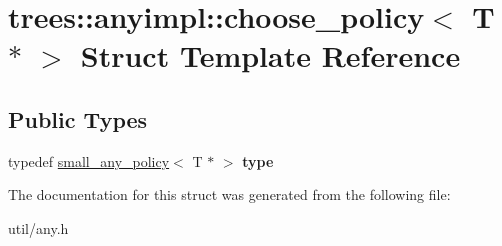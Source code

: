 \hypertarget{structtrees_1_1anyimpl_1_1choose__policy_3_01_t_01_5_01_4}{}\section{trees\+:\+:anyimpl\+:\+:choose\+\_\+policy$<$ T $\ast$ $>$ Struct Template Reference}
\label{structtrees_1_1anyimpl_1_1choose__policy_3_01_t_01_5_01_4}
\subsection*{Public Types}
\begin{DoxyCompactItemize}
\item 
\mbox{\label{structtrees_1_1anyimpl_1_1choose__policy_3_01_t_01_5_01_4_a209d5e160fad2f278728b0005c643fff}} 
typedef \hyperlink{structtrees_1_1anyimpl_1_1small__any__policy}{small\+\_\+any\+\_\+policy}$<$ T $\ast$ $>$ {\bfseries type}
\end{DoxyCompactItemize}


The documentation for this struct was generated from the following file\+:\begin{DoxyCompactItemize}
\item 
util/any.\+h\end{DoxyCompactItemize}
